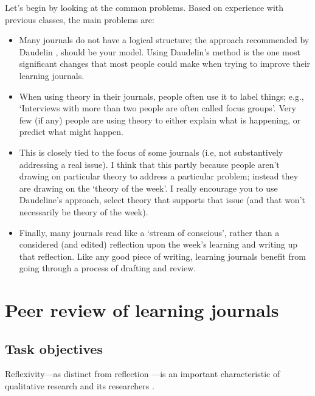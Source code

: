 \documentclass[]{book}
\theoremstyle{definition}
\theoremstyle{definition}
\theoremstyle{definition}
\theoremstyle{remark}
\begin{document}
Let's begin by looking at the common problems. Based on experience with
previous classes, the main problems are:

\begin{itemize}
\item
  Many journals do not have a logical structure; the approach
  recommended by Daudelin
  \autocite*{daudelin_1996_learningexperiencereflection}, should be your
  model. Using Daudelin's method is the one most significant changes
  that most people could make when trying to improve their learning
  journals.
\item
  When using theory in their journals, people often use it to label
  things; e.g., `Interviews with more than two people are often called
  focus groups'. Very few (if any) people are using theory to either
  explain what is happening, or predict what might happen.
\item
  This is closely tied to the focus of some journals (i.e, not
  substantively addressing a real issue). I think that this partly
  because people aren't drawing on particular theory to address a
  particular problem; instead they are drawing on the `theory of the
  week'. I really encourage you to use Daudeline's approach, select
  theory that supports that issue (and that won't necessarily be theory
  of the week).
\item
  Finally, many journals read like a `stream of conscious', rather than
  a considered (and edited) reflection upon the week's learning and
  writing up that reflection. Like any good piece of writing, learning
  journals benefit from going through a process of drafting and review.
\end{itemize}

\hypertarget{ass2}{%
\section{Peer review of learning journals}\label{ass2}}

\hypertarget{task-objectives-1}{%
\subsection*{Task objectives}\label{task-objectives-1}}

Reflexivity---as distinct from reflection
\autocite{hibbert_2010_reflexivityrecursionrelationality}---is an
important characteristic of qualitative research and its researchers
\autocite{haynes_2012_reflexivityqualitativeresearch}.
\end{document}
